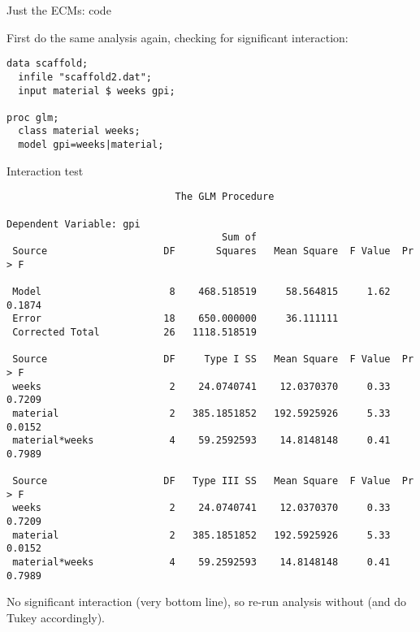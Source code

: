 \documentclass[pdf]{prosper}
\begin{document}
\begin{slide}{Just the ECMs: code}

First do the same analysis again, checking for significant interaction:

\begin{verbatim}
data scaffold;
  infile "scaffold2.dat";
  input material $ weeks gpi;

proc glm;
  class material weeks;
  model gpi=weeks|material;
\end{verbatim}
  
\end{slide}

\begin{slide}{Interaction test}

{\scriptsize
\begin{verbatim}
                             The GLM Procedure
 
Dependent Variable: gpi   
                                     Sum of
 Source                    DF       Squares   Mean Square  F Value  Pr > F

 Model                      8    468.518519     58.564815     1.62  0.1874
 Error                     18    650.000000     36.111111                 
 Corrected Total           26   1118.518519                               

 Source                    DF     Type I SS   Mean Square  F Value  Pr > F
 weeks                      2    24.0740741    12.0370370     0.33  0.7209
 material                   2   385.1851852   192.5925926     5.33  0.0152
 material*weeks             4    59.2592593    14.8148148     0.41  0.7989

 Source                    DF   Type III SS   Mean Square  F Value  Pr > F
 weeks                      2    24.0740741    12.0370370     0.33  0.7209
 material                   2   385.1851852   192.5925926     5.33  0.0152
 material*weeks             4    59.2592593    14.8148148     0.41  0.7989

\end{verbatim}
}

No significant interaction (very bottom line), so re-run analysis without (and do Tukey accordingly).
  
\end{slide}
\end{document}

